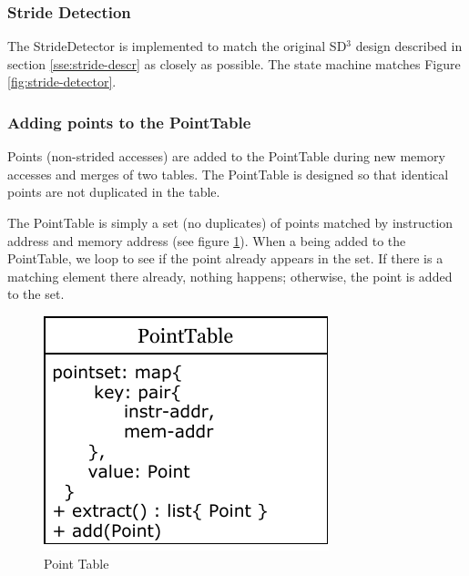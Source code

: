 \documentclass[12pt,twoside]{reedthesis}
\begin{document}
		
		\subsubsection{Stride Detection}
		
		The StrideDetector is implemented to match the original SD$^3$ design described in section \ref{sse:stride-descr} as closely as possible. The state machine matches Figure \ref{fig:stride-detector}.
		
		\subsubsection{Adding points to the PointTable}
		
			Points (non-strided accesses) are added to the PointTable during new memory accesses and merges of two tables. The PointTable is designed so that identical points are not duplicated in the table. 
			
			The PointTable is simply a set (no duplicates) of points matched by instruction address and memory address (see figure \ref{fig:point-table}). When a being added to the PointTable, we loop to see if the point already appears in the set.  If there is a matching element there already, nothing happens; otherwise, the point is added to the set. 
			
			\begin{figure}[h]
				\caption{Point Table}
				\label{fig:point-table}
				\includegraphics[scale=1.0]{point_data.pdf}
			\end{figure}
		
			
			
\end{document}
